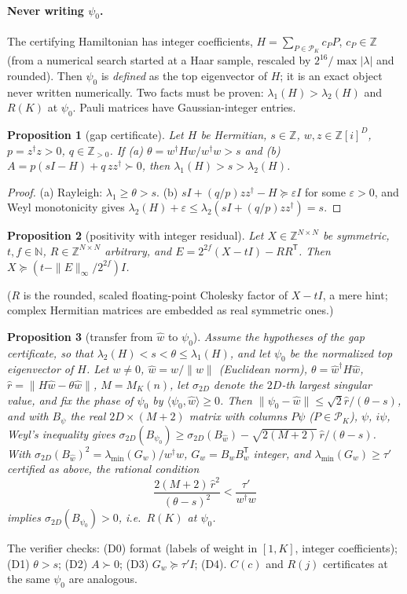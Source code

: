 \documentclass[aps,pra,onecolumn,superscriptaddress,nofootinbib,longbibliography,10pt]{revtex4-2}
\newtheorem{proposition}{Proposition}[section]
\theoremstyle{definition}
\newcommand{\ZZ}{\mathbb Z}
\begin{document}
\paragraph*{Never writing $\psi_0$.} The certifying Hamiltonian has integer coefficients, $H=\sum_{P\in\mathcal P_K}c_PP$, $c_P\in\ZZ$ (from a numerical search started at a Haar sample, rescaled by $2^{16}/\max|\lambda|$ and rounded). Then $\psi_0$ is \emph{defined} as the top eigenvector of $H$; it is an exact object never written numerically. Two facts must be proven: $\lambda_1(H)>\lambda_2(H)$ and $R(K)$ at $\psi_0$. Pauli matrices have Gaussian-integer entries.

\begin{proposition}[gap certificate]
Let $H$ be Hermitian, $s\in\ZZ$, $w,z\in\ZZ[i]^D$, $p=z^\dagger z>0$, $q\in\ZZ_{>0}$. If (a) $\theta=w^\dagger Hw/w^\dagger w>s$ and (b) $A=p(sI-H)+q\,zz^\dagger\succ0$, then $\lambda_1(H)>s>\lambda_2(H)$.
\end{proposition}
\begin{proof}
(a) Rayleigh: $\lambda_1\ge\theta>s$. (b) $sI+(q/p)zz^\dagger-H\succeq\varepsilon I$ for some $\varepsilon>0$, and Weyl monotonicity gives $\lambda_2(H)+\varepsilon\le\lambda_2(sI+(q/p)zz^\dagger)=s$.
\end{proof}
\begin{proposition}[positivity with integer residual]
Let $X\in\ZZ^{N\times N}$ be symmetric, $t,f\in\mathbb N$, $R\in\ZZ^{N\times N}$ arbitrary, and $E=2^{2f}(X-tI)-RR^{\mathsf T}$. Then $X\succeq(t-\|E\|_\infty/2^{2f})I$.
\end{proposition}
\noindent ($R$ is the rounded, scaled floating-point Cholesky factor of $X-tI$, a mere hint; complex Hermitian matrices are embedded as real symmetric ones.)
\begin{proposition}[transfer from $\hat w$ to $\psi_0$]
Assume the hypotheses of the gap certificate, so that $\lambda_2(H)<s<\theta\le\lambda_1(H)$, and let $\psi_0$ be the normalized top eigenvector of $H$. Let $w\ne0$, $\hat w=w/\|w\|$ (Euclidean norm), $\theta=\hat w^\dagger H\hat w$, $\hat r=\|H\hat w-\theta\hat w\|$, $M=M_K(n)$, let $\sigma_{2D}$ denote the $2D$-th largest singular value, and fix the phase of $\psi_0$ by $\langle\psi_0,\hat w\rangle\ge0$. Then $\|\psi_0-\hat w\|\le\sqrt2\hat r/(\theta-s)$, and with $B_\psi$ the real $2D\times(M+2)$ matrix with columns $P\psi$ ($P\in\mathcal P_K$), $\psi$, $i\psi$, Weyl's inequality gives $\sigma_{2D}(B_{\psi_0})\ge\sigma_{2D}(B_{\hat w})-\sqrt{2(M+2)}\,\hat r/(\theta-s)$. With $\sigma_{2D}(B_{\hat w})^2=\lambda_{\min}(G_w)/w^\dagger w$, $G_w=B_wB_w^{\mathsf T}$ integer, and $\lambda_{\min}(G_w)\ge\tau'$ certified as above, the rational condition
\[
\frac{2(M+2)\,\hat r^2}{(\theta-s)^2}<\frac{\tau'}{w^\dagger w}\tag{D4}
\]
implies $\sigma_{2D}(B_{\psi_0})>0$, i.e.\ $R(K)$ at $\psi_0$.
\end{proposition}
\noindent The verifier checks: (D0) format (labels of weight in $[1,K]$, integer coefficients); (D1) $\theta>s$; (D2) $A\succ0$; (D3) $G_w\succeq\tau'I$; (D4). $C(c)$ and $R(j)$ certificates at the same $\psi_0$ are analogous.
\end{document}

